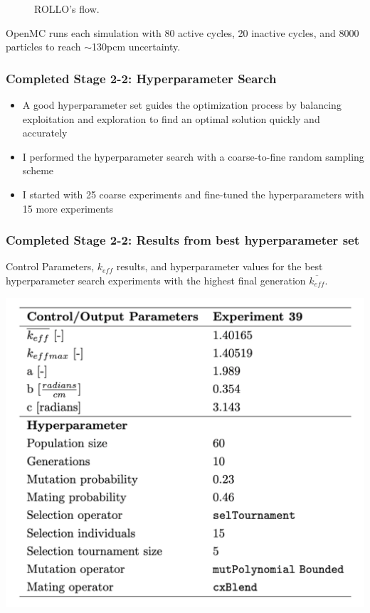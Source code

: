 \begin{frame}
\begin{minipage}[c]{0.4\textwidth}
\begin{figure}
            \caption{ROLLO's flow.}
        \end{figure}
    \end{minipage}
    \scriptsize
    OpenMC runs each simulation with 80 active cycles, 20 inactive cycles, and 
    8000 particles to reach $\sim$130pcm uncertainty.
\end{frame}

\begin{frame}
    \frametitle{Completed Stage 2-2: Hyperparameter Search}
    \begin{itemize}
        \item A good hyperparameter set guides the optimization process by 
        balancing exploitation and exploration to find an optimal solution quickly 
        and accurately
        \item I performed the hyperparameter search with a coarse-to-fine random 
        sampling scheme
        \item I started with 25 coarse experiments and fine-tuned the hyperparameters
        with 15 more experiments
    \end{itemize}
\end{frame}


\begin{frame}
    \frametitle{Completed Stage 2-2: Results from best hyperparameter set}
    \begin{table}
        \caption{Control Parameters, $k_{eff}$ results, and hyperparameter values for 
        the best hyperparameter search experiments with the highest final generation 
        $\overline{k_{eff}}$.}
        \includegraphics[width=0.6\linewidth]{figures/rollo-demo-best.png} 
    \end{table}
\end{frame}

